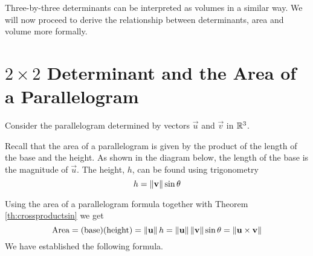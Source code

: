 \documentclass{ximera}
\begin{document}
Three-by-three determinants can be interpreted as volumes in a similar way.  We will now proceed to derive the relationship between determinants, area and volume more formally.


\section*{$2\times 2$ Determinant and the Area of a Parallelogram}

Consider the parallelogram determined by vectors $\vec{u}$ and $\vec{v}$ in $\mathbb{R}^3$.

\begin{image}[2.5in]
\end{image}

Recall that the area of a parallelogram is given by the product of the length of the base and the height.
As shown in the diagram below, the length of the base is the magnitude of $\vec{u}$. The height, $h$, can be found using trigonometry $$h=\left\lVert\mathbf{v}\right\rVert\sin\theta$$ 
\begin{image}[3in]
\end{image}
Using the area of a parallelogram formula together with Theorem \ref{th:crossproductsin} we get
$$\mbox{Area}=(\text{base})(\text{height})=\left\lVert\mathbf{u}\right\rVert h=\left\lVert\mathbf{u}\right\rVert\left\lVert\mathbf{v}\right\rVert\sin\theta=\left\lVert\mathbf{u}\times\mathbf{v}\right\rVert$$
We have established the following formula.
\end{document}
